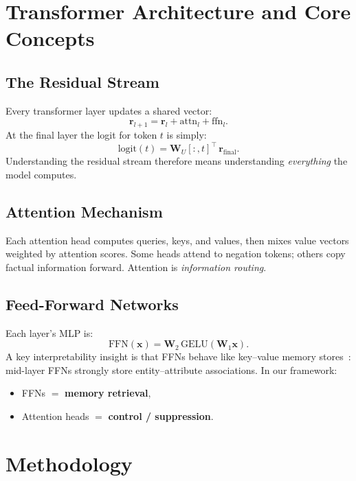 \documentclass[11pt]{article}
\begin{document}
\section{Transformer Architecture and Core Concepts}
\label{sec:arch}

\subsection{The Residual Stream}
Every transformer layer updates a shared vector:
\begin{equation}
\mathbf{r}_{l+1} = \mathbf{r}_{l} + \mathrm{attn}_l + \mathrm{ffn}_l .
\end{equation}
At the final layer the logit for token $t$ is simply:
\begin{equation}
\mathrm{logit}(t) = \mathbf{W}_U[:,t]^\top\, \mathbf{r}_{\mathrm{final}} .
\label{eq:logit}
\end{equation}
Understanding the residual stream therefore means understanding
\emph{everything} the model computes.

\subsection{Attention Mechanism}
Each attention head computes queries, keys, and values, then mixes value
vectors weighted by attention scores.  Some heads attend to negation tokens;
others copy factual information forward.  Attention is
\emph{information routing}.

\subsection{Feed-Forward Networks}
Each layer's MLP is:
\[ \mathrm{FFN}(\mathbf{x}) = \mathbf{W}_2\,\mathrm{GELU}(\mathbf{W}_1 \mathbf{x}). \]
A key interpretability insight is that FFNs behave like key--value memory
stores~\cite{geva-etal-2021-transformer}: mid-layer FFNs strongly store
entity--attribute associations.  In our framework:
\begin{itemize}
\item FFNs $=$ \textbf{memory retrieval},
\item Attention heads $=$ \textbf{control / suppression}.
\end{itemize}

\section{Methodology}
\label{sec:method}
\end{document}
